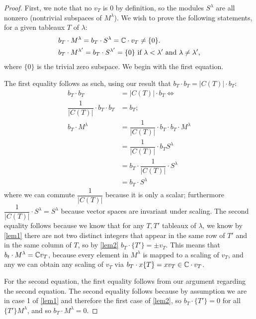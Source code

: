 \documentclass[12pt,twoside]{reedthesis}
\theoremstyle{plain}   %
\theoremstyle{definition}
\theoremstyle{remark}
\numberwithin{equation}{section}
\begin{document}
   \begin{proof}
     First, we note that no $v_T$ is $0$ by definition, so the modules $S^\lambda$ are all nonzero (nontrivial subspaces of $M^\lambda$).
     We wish to prove the following statements, for a given tableaux $T$ of $\lambda$:
     \begin{align}
       &b_T \cdot M^\lambda = b_T \cdot S^\lambda = \mathbb{C} \cdot v_T \neq \{0\}. \\
       &b_T \cdot M^{\lambda'} = b_T \cdot S^{\lambda'} = \{0\} \text{ if $\lambda < \lambda'$ and $\lambda \neq \lambda'$,}
     \end{align}
     where $\{0\}$ is the trivial zero subspace.
     We begin with the first equation. \par
     The first equality follows as such, using our result that $b_T \cdot b_T = |C(T)| \cdot b_T$:
     \begin{align*}
       b_T \cdot b_T &= |C(T)| \cdot b_T \iff \\
       \dfrac{1}{|C(T)|} \cdot b_T \cdot b_T &= b_T;\\
       b_T \cdot M^\lambda &= \dfrac{1}{|C(T)|} \cdot b_T \cdot b_T \cdot M^\lambda \\
                     &=\dfrac{1}{|C(T)|} \cdot b_T S^\lambda \\
                     &= b_T \cdot \dfrac{1}{|C(T)|}  \cdot S^\lambda \\
                     &= b_T \cdot S^\lambda
     \end{align*}
     where we can commute $\dfrac{1}{|C(T)|}$ because it is only a scalar; furthermore $\dfrac{1}{|C(T)|}  \cdot S^\lambda = S^\lambda$
     because vector spaces are invariant under scaling.
     The second equality follows because we know that for any $T,T'$ tableaux of $\lambda$, we know by \cref{lem1} there are not
     two distinct integers that appear in the same row of $T'$ and in the same column of $T$, so by \cref{lem2}
     $b_T \cdot \{T'\} = \pm v_T$.
     This means that $b_t \cdot M^\lambda = \mathbb{C} v_T$,
     because every element in $M^\lambda$ is mapped to a scaling of $v_T$, and any we can obtain any scaling of $v_T$ via
     $b_T \cdot x \{T\} =x v_T \in \mathbb{C} \cdot v_T$. \par
     For the second equation, the first equality follows from our argument regarding the second equation.
     The second equality follows because by assumption we are in case 1 of \cref{lem1} and therefore the first case of \cref{lem2},
     so $b_T \cdot \{T'\} = 0$ for all $\{T'\} M^\lambda$, and so $b_T \cdot M^\lambda = 0$.\par

\end{proof}
\end{document}
